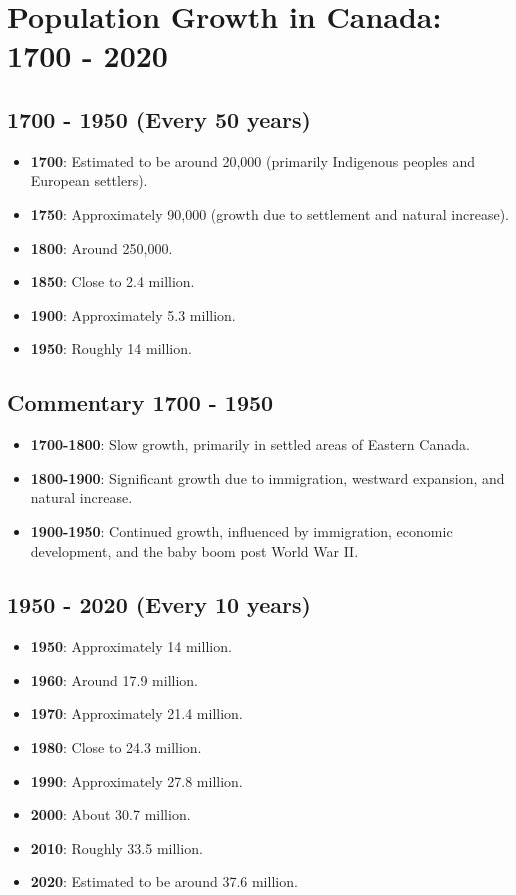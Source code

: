 \section{Population Growth in Canada: 1700 - 2020}

\subsection*{1700 - 1950 (Every 50 years)}
\begin{itemize}
    \item \textbf{1700}: Estimated to be around 20,000 (primarily Indigenous peoples and European settlers).
    \item \textbf{1750}: Approximately 90,000 (growth due to settlement and natural increase).
    \item \textbf{1800}: Around 250,000.
    \item \textbf{1850}: Close to 2.4 million.
    \item \textbf{1900}: Approximately 5.3 million.
    \item \textbf{1950}: Roughly 14 million.
\end{itemize}

\subsection*{Commentary 1700 - 1950}
\begin{itemize}
    \item \textbf{1700-1800}: Slow growth, primarily in settled areas of Eastern Canada.
    \item \textbf{1800-1900}: Significant growth due to immigration, westward expansion, and natural increase.
    \item \textbf{1900-1950}: Continued growth, influenced by immigration, economic development, and the baby boom post World War II.
\end{itemize}

\subsection*{1950 - 2020 (Every 10 years)}
\begin{itemize}
    \item \textbf{1950}: Approximately 14 million.
    \item \textbf{1960}: Around 17.9 million.
    \item \textbf{1970}: Approximately 21.4 million.
    \item \textbf{1980}: Close to 24.3 million.
    \item \textbf{1990}: Approximately 27.8 million.
    \item \textbf{2000}: About 30.7 million.
    \item \textbf{2010}: Roughly 33.5 million.
    \item \textbf{2020}: Estimated to be around 37.6 million.
\end{itemize}

